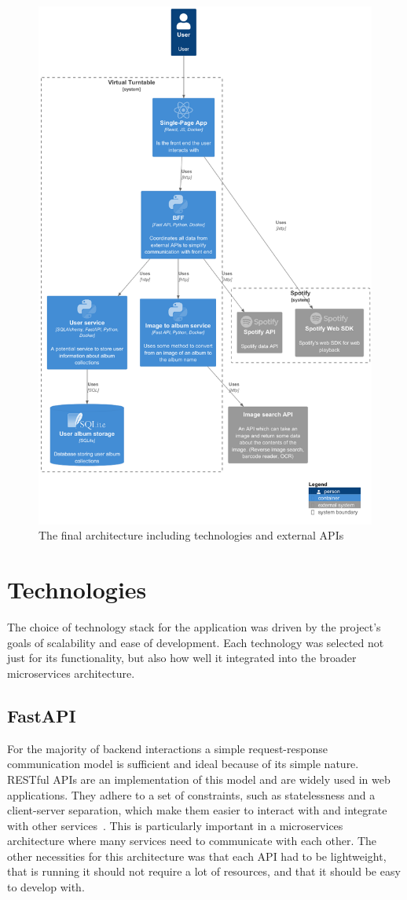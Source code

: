 \begin{figure} [H]
    \centering
    \includegraphics[width=0.5\linewidth]{figures/final_arch.png}
    \caption{The final architecture including technologies and external APIs}
    \label{fig:final-arch}
\end{figure}


\section{Technologies}
The choice of technology stack for the application was driven by the project's goals of scalability and ease of development. Each technology was selected not just for its functionality, but also how well it integrated into the broader microservices architecture.

\subsection{FastAPI}
For the majority of backend interactions a simple request-response communication model is sufficient and ideal because of its simple nature. RESTful APIs are an implementation of this model and are widely used in web applications. They adhere to a set of constraints, such as statelessness and a client-server separation, which make them easier to interact with and integrate with other services~\cite{Fielding}. This is particularly important in a microservices architecture where many services need to communicate with each other. The other necessities for this architecture was that each API had to be lightweight, that is running it should not require a lot of resources, and that it should be easy to develop with.

